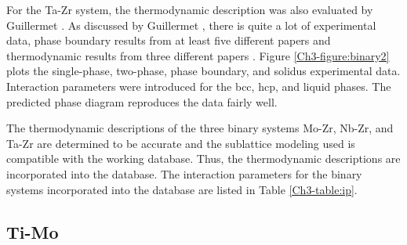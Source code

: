 For the Ta-Zr system, the thermodynamic description was also evaluated by Guillermet \cite{Guillermet1995}. As discussed by Guillermet \cite{Guillermet1995}, there is quite a lot of experimental data, phase boundary results from at least five different papers and thermodynamic results from three different papers \cite{Guillermet1995}. Figure \ref{Ch3-figure:binary2} plots the single-phase, two-phase, phase boundary, and solidus experimental data. Interaction parameters were introduced for the bcc, hcp, and liquid phases. The predicted phase diagram reproduces the data fairly well. 

The thermodynamic descriptions of the three binary systems Mo-Zr, Nb-Zr, and Ta-Zr are determined to be accurate and the sublattice modeling used is compatible with the working database. Thus, the thermodynamic descriptions are incorporated into the database. The interaction parameters for the binary systems incorporated into the database are listed in Table \ref{Ch3-table:ip}. 

\subsection{Ti-Mo}

